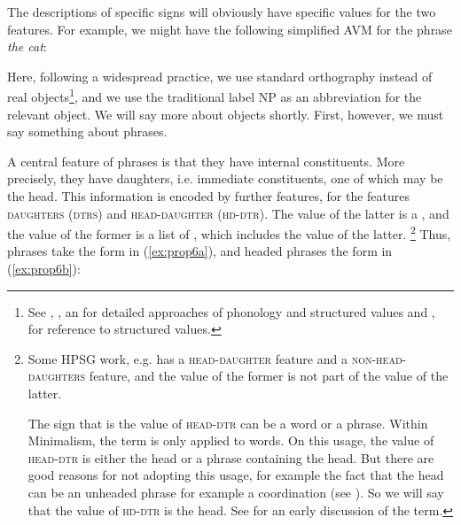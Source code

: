 \documentclass[output=paper
	        ,collection
	        ,collectionchapter
 	        ,biblatex
                ,babelshorthands
                ,newtxmath
                ,draftmode
                ,colorlinks, citecolor=brown
]{langscibook}
\begin{document}
\ea\label{ex:prop4}
\z

\noindent
The descriptions of specific signs will obviously have specific values for the two features. For example, we might have the following simplified AVM for the phrase \emph{the cat}:

\ea\label{ex:prop5}
\z

\noindent
Here, following a widespread practice, we use standard orthography instead of real 
objects\footnote{%
See \citet{BK94b}, \citet{Hoehle99a-u}, an \citet{Walther99a-u} for detailed approaches of phonology
and structured \phon values and , \crossrefchaptert[\page \pageref{coord:page-rnr-I-phi-start}--\pageref{coord:page-rnr-I-phi-end}]{coordination} for reference to structured \phon values.
},
and we use the traditional label NP as an abbreviation for the relevant  object. We will say more about  objects shortly. First, however, we must say something about phrases.

A central feature of phrases is that they have internal constituents. More precisely, they have daughters, i.e. immediate constituents, one of which may be the head. This information is encoded by further features, for \citet[29]{GSag2000a-u} the features \textsc{daughters} (\textsc{dtrs}) and \textsc{head-daughter} (\textsc{hd-dtr}). The value of the latter is a , and the value of the former is a list of , which includes the value of the latter.%
%
\footnote{Some HPSG work, e.g. \citet{Sag97a} has a \textsc{head-daughter} feature and a \textsc{non-head-daughters} feature, and the value of the former is not part of the value of the latter. 

The sign that is the value of \textsc{head-dtr} can be a word or a phrase. Within Minimalism, the term  is only applied to words. On this usage, the value of \textsc{head-dtr} is either the head or a phrase containing the head. But there are good reasons for not adopting this usage, for example the fact that the head can be an unheaded phrase for example a coordination (see ). So we will say that the value of \textsc{hd-dtr} is the head. See \citet[30]{Jackendoff77a} for an early discussion of the term.}
%
Thus, phrases take the form in (\ref{ex:prop6a}), and headed phrases the form in (\ref{ex:prop6b}):
\end{document}
